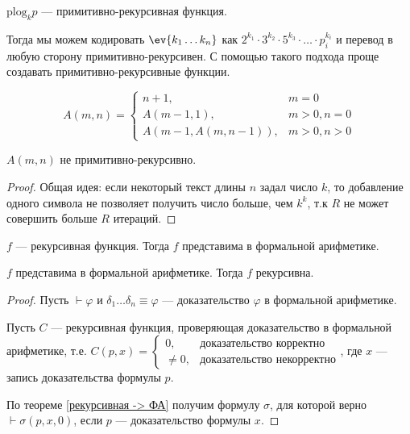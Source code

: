 \(\text{plog}_k p\) --- примитивно-рекурсивная функция.

Тогда мы можем кодировать \(\ev{k_1 \dots k_n}\) как \(2^{k_1} \cdot 3^{k_2} \cdot 5^{k_3} \cdot \ldots \cdot p_i^{k_i}\) и перевод в любую сторону примитивно-рекурсивен. С помощью такого подхода проще создавать примитивно-рекурсивные функции.

\begin{definition}
    \[A(m, n) = \begin{cases}
            n + 1,                 & m = 0        \\
            A(m - 1, 1),           & m > 0, n = 0 \\
            A(m - 1, A(m, n - 1)), & m > 0, n > 0
        \end{cases}\]
\end{definition}
\begin{statement}
    \(A(m, n)\) не примитивно-рекурсивно.
\end{statement}
\begin{proof}
    Общая идея: если некоторый текст длины \(n\) задал число \(k\), то добавление одного символа не позволяет получить число больше, чем \(k^k\), т.к \(R\) не может совершить больше \(R\) итераций.
\end{proof}

\begin{theorem}
    \(f\) --- рекурсивная функция. Тогда \(f\) представима в формальной арифметике.
    \label{рекурсивная -> ФА}
\end{theorem}
\begin{theorem}
    \(f\) представима в формальной арифметике. Тогда \(f\) рекурсивна.
\end{theorem}

\begin{proof}
    Пусть \(\vdash \varphi\) и \(\delta_1 \dots \delta_n \equiv \varphi\) --- доказательство \(\varphi\) в формальной арифметике.

    Пусть \(C\) --- рекурсивная функция, проверяющая доказательство в формальной арифметике, т.е. \(C(p, x) = \begin{cases} 0, & \text{доказательство корректно} \\ \neq 0, & \text{доказательство некорректно} \end{cases} \), где \(x\) --- запись доказательства формулы \(p\).

    По теореме \ref{рекурсивная -> ФА} получим формулу \(\sigma\), для которой верно \(\vdash \sigma(p, x, 0)\), если \(p\) --- доказательство формулы \(x\).
\end{proof}

